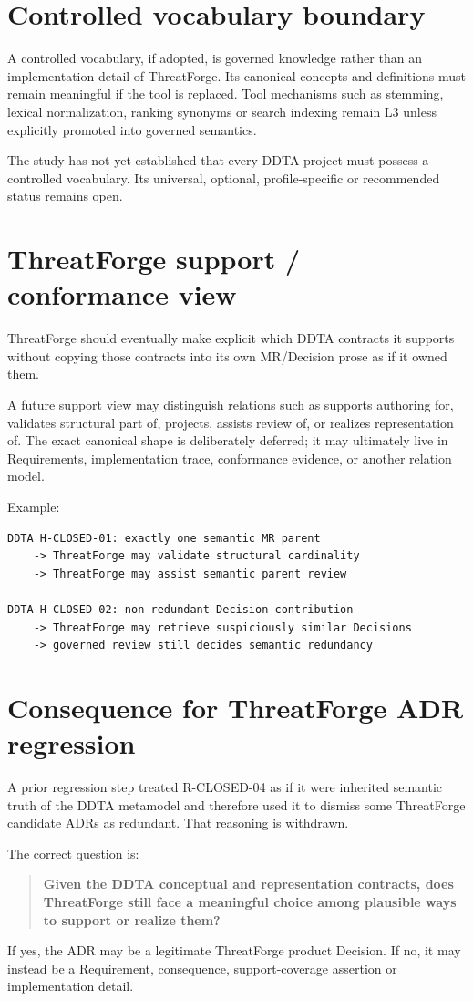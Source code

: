 \documentclass[11pt,a4paper]{article}
\newcommand{\ruletext}[1]{\begin{quote}\bfseries #1\end{quote}}
\begin{document}
\section{Controlled vocabulary boundary}
A controlled vocabulary, if adopted, is governed knowledge rather than an implementation detail of ThreatForge. Its canonical concepts and definitions must remain meaningful if the tool is replaced. Tool mechanisms such as stemming, lexical normalization, ranking synonyms or search indexing remain L3 unless explicitly promoted into governed semantics.

The study has not yet established that every DDTA project must possess a controlled vocabulary. Its universal, optional, profile-specific or recommended status remains open.

\section{ThreatForge support / conformance view}
ThreatForge should eventually make explicit which DDTA contracts it supports without copying those contracts into its own MR/Decision prose as if it owned them.

A future support view may distinguish relations such as supports authoring for, validates structural part of, projects, assists review of, or realizes representation of. The exact canonical shape is deliberately deferred; it may ultimately live in Requirements, implementation trace, conformance evidence, or another relation model.

Example:
\begin{verbatim}
DDTA H-CLOSED-01: exactly one semantic MR parent
    -> ThreatForge may validate structural cardinality
    -> ThreatForge may assist semantic parent review

DDTA H-CLOSED-02: non-redundant Decision contribution
    -> ThreatForge may retrieve suspiciously similar Decisions
    -> governed review still decides semantic redundancy
\end{verbatim}

\section{Consequence for ThreatForge ADR regression}
A prior regression step treated R-CLOSED-04 as if it were inherited semantic truth of the DDTA metamodel and therefore used it to dismiss some ThreatForge candidate ADRs as redundant. That reasoning is withdrawn.

The correct question is:
\ruletext{Given the DDTA conceptual and representation contracts, does ThreatForge still face a meaningful choice among plausible ways to support or realize them?}
If yes, the ADR may be a legitimate ThreatForge product Decision. If no, it may instead be a Requirement, consequence, support-coverage assertion or implementation detail.
\end{document}
